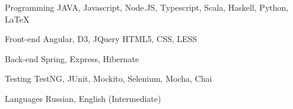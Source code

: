 

\begin{cvskills}

  \cvskill
    {Programming} %
    {JAVA, Javascript, Node.JS, Typescript, Scala, Haskell, Python, LaTeX} %

  \cvskill
    {Front-end} %
    {Angular, D3, JQuery  HTML5, CSS, LESS} %

  \cvskill
    {Back-end} %
    {Spring, Express, Hibernate} %

  \cvskill
    {Testing} %
    {TestNG, JUnit,  Mockito, Selenium, Mocha, Chai} %

  \cvskill
    {Languages} %
    {Russian, English (Intermediate)} %

\end{cvskills}
